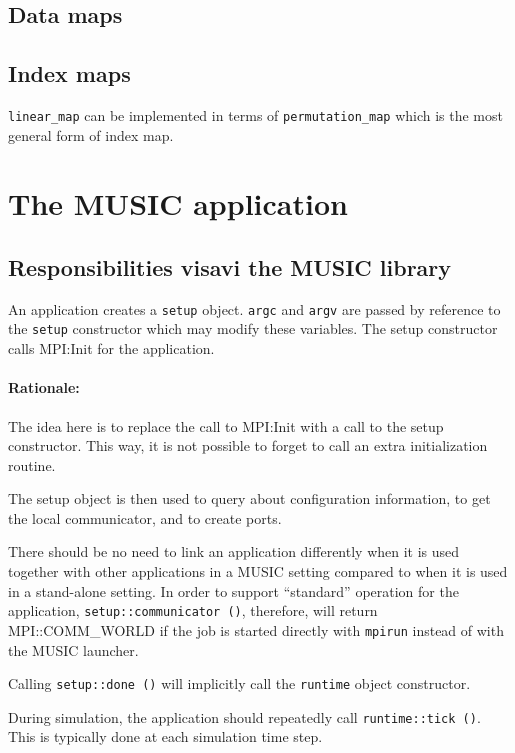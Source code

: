 \documentclass[a4paper]{report}
\newenvironment{rationale}%
{\par\paragraph{Rationale:}}%
{\par}
\begin{document}
\subsection{Data maps}

\subsection{Index maps}

\verb|linear_map| can be implemented in terms of
\verb|permutation_map| which is the most general form of index map.

\section{The MUSIC application}

\subsection{Responsibilities visavi the MUSIC library}
\label{sec:responsibilities}

An application creates a \verb|setup| object.  \verb|argc| and
\verb|argv| are passed by reference to the \verb|setup| constructor
which may modify these variables.  The setup constructor calls
MPI:Init for the application.

\begin{rationale}
  The idea here is to replace the call to MPI:Init with a call to the
  setup constructor.  This way, it is not possible to forget to call
  an extra initialization routine.
\end{rationale}

The setup object is then used to query about configuration
information, to get the local communicator, and to create ports.

There should be no need to link an application differently when it is
used together with other applications in a MUSIC setting compared to
when it is used in a stand-alone setting.  In order to support
``standard'' operation for the application,
\verb|setup::communicator ()|, therefore, will return MPI::COMM\_WORLD
if the job is started directly with \verb|mpirun| instead of with the
MUSIC launcher.

Calling \verb|setup::done ()| will implicitly call the \verb|runtime|
object constructor.

During simulation, the application should repeatedly call
\verb|runtime::tick ()|.  This is typically done at each simulation
time step.
\end{document}
